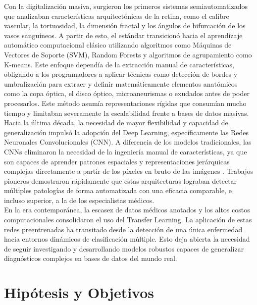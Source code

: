 \documentclass[12pt, a4paper]{article}
\begin{document}
Con la digitalización masiva, surgieron los primeros sistemas semiautomatizados que analizaban características arquitectónicas de la retina, como el calibre vascular, la tortuosidad, la dimensión fractal y los ángulos de bifurcación de los vasos sanguíneos. A partir de esto, el estándar transicionó hacia el aprendizaje automático computacional clásico utilizando algoritmos como Máquinas de Vectores de Soporte (SVM), Random Forests y algoritmos de agrupamiento como K-means. Este enfoque dependía de la extracción manual de características, obligando a los programadores a aplicar técnicas como detección de bordes y umbralización para extraer y definir matemáticamente elementos anatómicos como la copa óptica, el disco óptico, microaneurismas o exudados antes de poder procesarlos. Este método asumía representaciones rígidas que consumían mucho tiempo y limitaban severamente la escalabilidad frente a bases de datos masivas.\\

Hacia la última década, la necesidad de mayor flexibilidad y capacidad de generalización impulsó la adopción del Deep Learning, específicamente las Redes Neuronales Convolucionales (CNN). A diferencia de los modelos tradicionales, las CNNs eliminaron la necesidad de la ingeniería manual de características, ya que son capaces de aprender patrones espaciales y representaciones jerárquicas complejas directamente a partir de los píxeles en bruto de las imágenes
. Trabajos pioneros demostraron rápidamente que estas arquitecturas lograban detectar múltiples patologías de forma automatizada con una eficacia comparable, e incluso superior, a la de los especialistas médicos.\\

En la era contemporánea, la escasez de datos médicos anotados y los altos costos computacionales consolidaron el uso del Transfer Learning. La aplicación de estas redes preentrenadas ha transitado desde la detección de una única enfermedad hacia entornos dinámicos de clasificación múltiple. Esto deja abierta la necesidad de seguir investigando y desarrollando modelos robustos capaces de generalizar diagnósticos complejos en bases de datos del mundo real.




\newpage
\section{Hipótesis y Objetivos}
\end{document}
